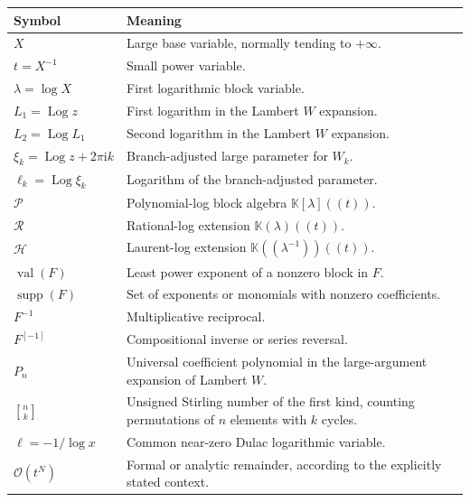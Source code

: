 \documentclass[11pt,openany]{book}
\theoremstyle{definition}
\theoremstyle{plain}
\theoremstyle{remark}
\newcommand{\K}{\mathbb{K}}
\newcommand{\Plog}{\mathscr{P}}
\newcommand{\Rlog}{\mathscr{R}}
\newcommand{\Hlog}{\mathscr{H}}
\newcommand{\ii}{\mathrm{i}}
\newcommand{\bigO}{\mathcal{O}}
\newcommand{\invcomp}{^{[-1]}}
\newcommand{\stirlingone}[2]{\genfrac{[}{]}{0pt}{}{#1}{#2}}
\DeclareMathOperator{\supp}{supp}
\DeclareMathOperator{\val}{val}
\DeclareMathOperator{\Log}{Log}
\begin{document}
\begin{longtable}{@{}p{}p{}@{}}
\toprule
Symbol & Meaning\\
\midrule
\endhead
\(X\) & Large base variable, normally tending to \(+\infty\).\\
\(t=X^{-1}\) & Small power variable.\\
\(\lambda=\log X\) & First logarithmic block variable.\\
\(L_1=\Log z\) & First logarithm in the Lambert \(W\) expansion.\\
\(L_2=\Log L_1\) & Second logarithm in the Lambert \(W\) expansion.\\
\(\xi_k=\Log z+2\pi\ii k\) & Branch-adjusted large parameter for \(W_k\).\\
\(\ell_k=\Log\xi_k\) & Logarithm of the branch-adjusted parameter.\\
\(\Plog\) & Polynomial-log block algebra \(\K[\lambda]((t))\).\\
\(\Rlog\) & Rational-log extension \(\K(\lambda)((t))\).\\
\(\Hlog\) & Laurent-log extension \(\K((\lambda^{-1}))((t))\).\\
\(\val(F)\) & Least power exponent of a nonzero block in \(F\).\\
\(\supp(F)\) & Set of exponents or monomials with nonzero coefficients.\\
\(F^{-1}\) & Multiplicative reciprocal.\\
\(F\invcomp\) & Compositional inverse or series reversal.\\
\(P_n\) & Universal coefficient polynomial in the large-argument expansion of Lambert \(W\).\\
\(\stirlingone{n}{k}\) & Unsigned Stirling number of the first kind, counting permutations of \(n\) elements with \(k\) cycles.\\
\(\ell=-1/\log x\) & Common near-zero Dulac logarithmic variable.\\
\(\bigO(t^N)\) & Formal or analytic remainder, according to the explicitly stated context.\\
\bottomrule
\end{longtable}

\end{document}
